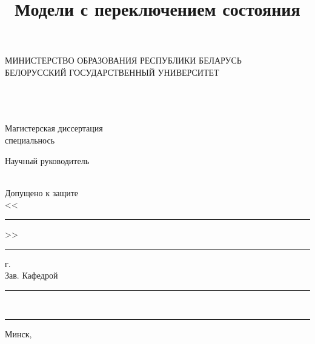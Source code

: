 \documentclass[a4paper,14pt]{extreport}
\title{Модели с переключением состояния}
\author{\@authorlast \@authorfirst}
\makeatletter
\newcommand*{\@authorfirst}{}
\newcommand*{\@authorlast}{}
\newcommand*{\@mentor}{}
\newcommand*{\@mentorjob}{}
\newcommand*{\@faculty}{}
\newcommand*{\@subfaculty}{}
\newcommand*{\@specialty}{}
\makeatother
\begin{document}

\begin{titlepage}
	\begin{center}
		\small{МИНИСТЕРСТВО ОБРАЗОВАНИЯ РЕСПУБЛИКИ БЕЛАРУСЬ}\\
		\small{БЕЛОРУССКИЙ ГОСУДАРСТВЕННЫЙ УНИВЕРСИТЕТ}\\
		\small{\MakeUppercase{\@faculty}}\\
		\@subfaculty
	\end{center}
																							  
	\vspace{5em}
																							  
	\begin{center}
		\MakeUppercase{\@authorlast} \@authorfirst \\
		\vspace{1em}
		\textbf{\MakeUppercase{\@title}} \\
		\vspace{2em}
		Магистерская диссертация \\
		специальнось \@specialty
	\end{center}
																							
	\vspace{2em}
	\begin{flushright}
		\begin{minipage}[H]{0.4\textwidth}
			\begin{flushleft}
				Научный руководитель \\
				\@mentor \\
				\@mentorjob
			\end{flushleft}
		\end{minipage}
	\end{flushright}
												
	\vspace{3em}
												
	\vfill
														
	\begin{flushleft}
		\begin{minipage}[H]{0.5\textwidth}
			\begin{flushleft}
				Допущено к защите \\
				<<\rule{1cm}{1pt}>> \rule{4cm}{1pt} \the\year г. \\
				Зав. Кафедрой \\
				\rule{6cm}{1pt} \\
				\rule{6cm}{1pt}
			\end{flushleft}
		\end{minipage}
	\end{flushleft}
																							
	\vspace{1em}
																							  
	\begin{center}
		Минск, \the\year
	\end{center}
\end{titlepage}
\end{document}
